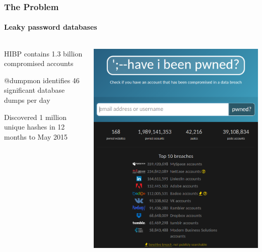 \documentclass[handout, notes=hide]{beamer}
\begin{document}
\begin{frame}
\frametitle{The Problem}
\framesubtitle{Leaky password databases}
\setlength{\parskip}{0.5em}

\begin{columns}[T]
\begin{column}[T]{0.6\textwidth}
\setlength{\parskip}{0.5em}

HIBP contains 1.3 billion compromised accounts

@dumpmon identifies 46 significant database dumps per day

Discovered 1 million unique hashes in 12 months to May 2015

\end{column}
\begin{column}[T]{0.4\textwidth}
\vspace{0.0em}
\includegraphics[width=1.0\textwidth]{hibp}
\end{column}
\end{columns}


\end{frame}
\end{document}
